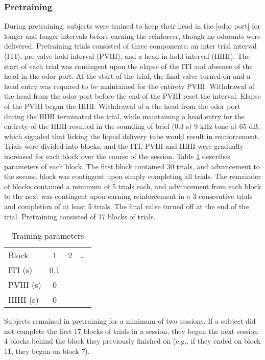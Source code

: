 \subsubsection{Pretraining}
During pretraining, subjects were trained to keep their head in the [odor port] for longer and longer intervals before earning the reinforcer, though no odorants were delivered. Pretraining trials consisted of three components: an inter trial interval (ITI), pre-valve hold interval (PVHI), and a head-in hold interval (HIHI). The start of each trial was contingent upon the elapse of the ITI and absence of the head in the odor port. At the start of the trial, the final valve turned on and a head entry was required to be maintained for the entirety PVHI. Withdrawal of the head from the odor port before the end of the PVHI reset the interval. Elapse of the PVHI began the HIHI. Withdrawal of a the head from the odor port during the HIHI terminated the trial, while maintaining a head entry for the entirety of the HIHI resulted in the sounding of brief (0.3 s) 9 kHz tone at 65 dB, which signaled that licking the liquid delivery tube would result in reinforcement.
Trials were divided into blocks, and the ITI, PVHI and HIHI were gradually increased for each block over the course of the session. Table \ref{table:training_parameters} describes parameters of each block. The first block contained 30 trials, and advancement to the second block was contingent upon simply completing all trials. The remainder of blocks contained a minimum of 5 trials each, and advancement from each block to the next was contingent upon earning reinforcement in a 3 consecutive trials and completion of at least 5 trials. The final valve turned off at the end of the trial. Pretraining consisted of 17 blocks of trials.

\begin{table}
\label{table:training_parameters}
\caption{Training parameters}
\begin{tabular}{| l | c | c | c |}
Block & 1 & 2 & ... \\
ITI (s) & 0.1 & & \\
PVHI (s) & 0 & & \\
HIHI (s) & 0 & & \\
\end{tabular}
\end{table}

Subjects remained in pretraining for a minimum of two sessions.  If a subject did not complete the first 17 blocks of trials in a session, they began the next session 4 blocks behind the block they previously finished on (e.g., if they ended on block 11, they began on block 7).

